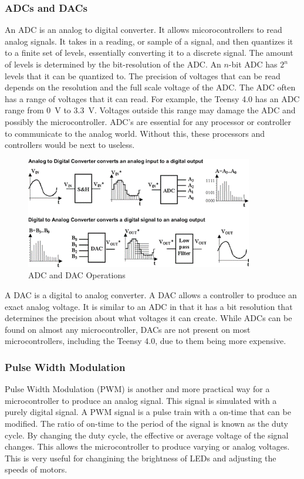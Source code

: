 \documentclass[12pt]{article}
\begin{document}
\subsubsection{ADCs and DACs}


An ADC is an analog to digital converter. It allows micorocontrollers to read analog signals. It takes in a reading, or sample of a signal, and then quantizes it to a finite set of levels, essentially converting it to a discrete signal. The amount of levels is determined by the bit-resolution of the ADC. An $n$-bit ADC has $2^n$ levels that it can be quantized to. The precision of voltages that can be read depends on the resolution and the full scale voltage of the ADC. The ADC often has a range of voltages that it can read. For example, the Teensy 4.0 has an ADC range from \SI{0}{\volt} to \SI{3.3}{\volt}. Voltages outside this range may damage the ADC and possibly the microcontroller.  ADC's are essential for any processor or controller to communicate to the analog world. Without this, these processors and controllers would be next to useless.

\begin{figure}[h]
    \centering
    \includegraphics{adc_dac.png}
    \caption{ADC and DAC Operations}
    \label{fig:my_label}
\end{figure}

A DAC is a digital to analog converter. A DAC allows a controller to produce an exact analog voltage. It is similar to an ADC in that it has a bit resolution that determines the precision about what voltages it can create. While ADCs can be found on almost any microcontroller, DACs are not present on most microcontrollers, including the Teensy 4.0, due to them being more expensive. 


\subsubsection{Pulse Width Modulation}

Pulse Width Modulation (PWM) is another and more practical way for a microcontroller to produce an analog signal. This signal is simulated with a purely digital signal. A PWM signal is a pulse train with a on-time that can be modified. The ratio of on-time to the period of the signal is known as the duty cycle. By changing the duty cycle, the effective or average voltage of the signal changes. This allows the microcontroller to produce varying or analog voltages. This is very useful for changining the brightness of LEDs and adjusting the speeds of motors.
\end{document}
